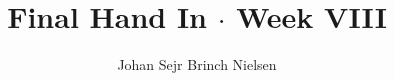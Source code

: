 \makeatletter %
\def\maketitle{%
 \null
 \thispagestyle{empty}%
 \vfill
 \begin{center}\leavevmode
   \normalfont
   \LARGE{\raggedleft \@title\par}%
   \hrulefill\par
   \large{\raggedleft \subtitle\par}%
   \vskip 2cm
   {\today\par}%
 \end{center}%
 \vfill
 \begin{flushleft}
   {\large \@author } \\
   {\footnotesize \suplementInfo }
 \end{flushleft}
 \clearpage %
}
\makeatother %
\title{Final Hand In $\cdot$ Week VIII}

\def\subtitle{CCO $\cdot$ Constraint Continuous Optimization}

\author{Johan Sejr Brinch Nielsen} \def\suplementInfo{

\kern 5pt \hrule width 11pc \kern 5pt

\begin{tabular}{ll}
Email: & zerrez@diku.dk  \\
Cpr.:  & 260886-2547
\end{tabular}

\kern 5pt \hrule width 11pc \kern 5pt

Dept. of Computer Science,  \\
University of Copenhagen

}
